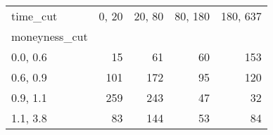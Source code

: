 \begin{tabular}{lrrrr}
\toprule
time\_cut &  0, 20 &  20, 80 &  80, 180 &  180, 637 \\
moneyness\_cut &          &           &            &             \\
\midrule
0.0, 0.6    &       15 &        61 &         60 &         153 \\
0.6, 0.9    &      101 &       172 &         95 &         120 \\
0.9, 1.1    &      259 &       243 &         47 &          32 \\
1.1, 3.8    &       83 &       144 &         53 &          84 \\
\bottomrule
\end{tabular}

